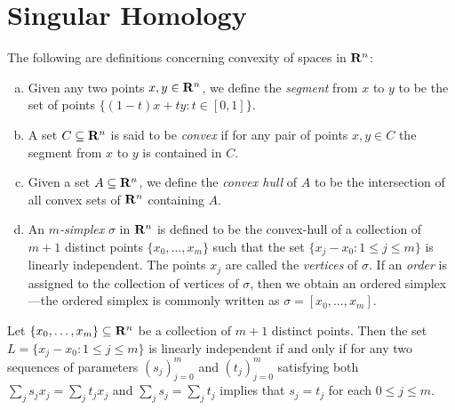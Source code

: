 \section{Singular Homology}

\begin{definition}[Convexity]
\label{def:convexity}
The following are definitions concerning convexity of spaces in \(\mathbf{R}^n\):
\begin{enumerate}[(a)]\setlength\itemsep{0em}
\item Given any two points \(x, y \in \mathbf{R}^n\), we define the \emph{segment} from
  \(x\) to \(y\) to be the set of points
  \(\{(1-t) x + t y \colon t \in [0, 1]\}\).

\item A set \(C \subseteq \mathbf{R}^n\) is said to be \emph{convex} if for any pair of
  points \(x, y \in C\) the segment from \(x\) to \(y\) is contained in \(C\).

\item Given a set \(A \subseteq \mathbf{R}^n\), we define the \emph{convex hull} of
  \(A\) to be the intersection of all convex sets of \(\mathbf{R}^n\) containing \(A\).

\item An \emph{\(m\)-simplex} \(\sigma\) in \(\mathbf{R}^n\) is defined to be the
  convex-hull of a collection of \(m+1\) distinct points \(\{x_0, \dots, x_m\}\)
  such that the set \(\{x_j - x_0 \colon 1 \leq j \leq m\}\) is linearly
  independent. The points \(x_j\) are called the \emph{vertices} of
  \(\sigma\). If an \emph{order} is assigned to the collection of vertices of
  \(\sigma\), then we obtain an ordered simplex---the ordered simplex is
  commonly written as \(\sigma = [x_0, \dots, x_m]\).
\end{enumerate}
\end{definition}

\begin{lemma}
\label{lem:linear-independence-simplex}
Let \(\{x_0, \dots, x_m\} \subseteq \mathbf{R}^n\) be a collection of \(m+1\) distinct
points. Then the set \(L = \{x_j - x_0 \colon 1 \leq j \leq m\}\) is linearly
independent if and only if for any two sequences of parameters \((s_j)_{j=0}^m\)
and \((t_j)_{j=0}^m\) satisfying both \(\sum_j s_j x_j = \sum_j t_j x_j\) and
\(\sum_j s_j = \sum_j t_j\) implies that \(s_j = t_j\) for each \(0 \leq j \leq m\).
\end{lemma}

